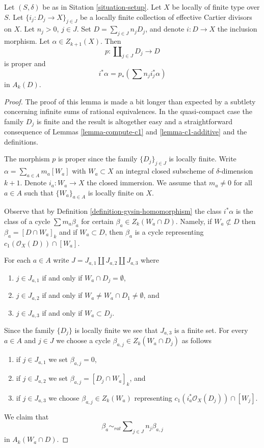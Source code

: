 \begin{lemma}
\label{lemma-improved-additivity}
Let $(S, \delta)$ be as in Sitation \ref{situation-setup}.
Let $X$ be locally of finite type over $S$.
Let $\{i_j : D_j \to X \}_{j \in J}$ be a locally finite collection
of effective Cartier divisors on $X$. Let $n_j > 0$, $j\in J$.
Set $D = \sum_{j \in J} n_j D_j$, and denote $i : D \to X$ the
inclusion morphism. Let $\alpha \in Z_{k + 1}(X)$. Then
$$
p : \coprod\nolimits_{j \in J} D_j \longrightarrow D
$$
is proper and
$$
i^*\alpha = p_*\left(\sum n_j i_j^*\alpha\right)
$$
in $A_k(D)$.
\end{lemma}

\begin{proof}
The proof of this lemma is made a bit longer than expected
by a subtlety concerning infinite sums of rational equivalences.
In the quasi-compact case the family $D_j$ is finite and the result
is altogether easy and a straightforward consequence of
Lemmas \ref{lemma-compute-c1} and
\ref{lemma-c1-additive} and the definitions.

\medskip\noindent
The morphism $p$ is proper since the family $\{D_j\}_{j \in J}$
is locally finite. Write $\alpha = \sum_{a \in A} m_a [W_a]$
with $W_a \subset X$ an integral closed subscheme of
$\delta$-dimension $k + 1$.
Denote $i_a : W_a \to X$ the closed immersion.
We assume that $m_a \not = 0$ for all $a \in A$ such that
$\{W_a\}_{a \in A}$ is locally finite on $X$.

\medskip\noindent
Observe that
by Definition \ref{definition-gysin-homomorphism}
the class $i^*\alpha$ is the class of a cycle
$\sum m_a\beta_a$ for certain $\beta_a \in Z_k(W_a \cap D)$.
Namely, if $W_a \not \subset D$ then $\beta_a = [D \cap W_a]_k$
and if $W_a \subset D$, then $\beta_a$ is a cycle
representing $c_1(\mathcal{O}_X(D)) \cap [W_a]$.

\medskip\noindent
For each $a \in A$ write $J = J_{a, 1} \coprod J_{a, 2} \coprod J_{a, 3}$
where
\begin{enumerate}
\item $j \in J_{a, 1}$ if and only if $W_a \cap D_j = \emptyset$,
\item $j \in J_{a, 2}$ if and only if
$W_a \not = W_a \cap D_1 \not = \emptyset$, and
\item $j \in J_{a, 3}$ if and only if $W_a \subset D_j$.
\end{enumerate}
Since the family $\{D_j\}$ is locally finite we see that
$J_{a, 3}$ is a finite set. For every $a \in A$ and $j \in J$
we choose a cycle $\beta_{a, j} \in Z_k(W_a \cap D_j)$ as follows
\begin{enumerate}
\item if $j \in J_{a, 1}$ we set $\beta_{a, j} = 0$,
\item if $j \in J_{a, 2}$ we set $\beta_{a, j} = [D_j \cap W_a]_k$, and
\item if $j \in J_{a, 3}$ we choose $\beta_{a, j} \in Z_k(W_a)$
representing $c_1(i_a^*\mathcal{O}_X(D_j)) \cap [W_j]$.
\end{enumerate}
We claim that
$$
\beta_a \sim_{rat}
\sum\nolimits_{j \in J} n_j \beta_{a, j}
$$
in $A_k(W_a \cap D)$.


\end{proof}
